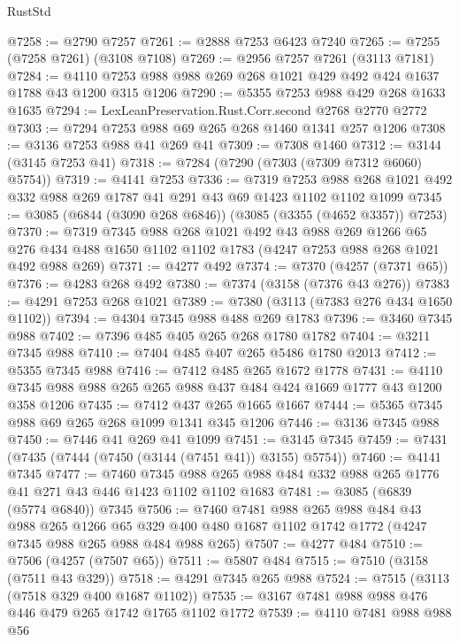 \begin{lexlean}{RustStd}
\begin{coremodule}
{\begin{coremodule}
{{{{{{{{{{{{{{{{{{{{{{{{{{@7258 := @2790 @7257
@7261 := @2888 @7253 @6423 @7240
@7265 := @7255 (@7258 @7261) (@3108 @7108)
@7269 := @2956 @7257 @7261 (@3113 @7181)
@7284 := @4110 @7253 @988 @988 @269 @268 @1021 @429 @492 @424 @1637 @1788 @43 @1200 @315 @1206
@7290 := @5355 @7253 @988 @429 @268 @1633 @1635
@7294 := LexLeanPreservation.Rust.Corr.second @2768 @2770 @2772
@7303 := @7294 @7253 @988 @69 @265 @268 @1460 @1341 @257 @1206
@7308 := @3136 @7253 @988 @41 @269 @41
@7309 := @7308 @1460
@7312 := @3144 (@3145 @7253 @41)
@7318 := @7284 (@7290 (@7303 (@7309 @7312 @6060) @5754))
@7319 := @4141 @7253
@7336 := @7319
    @7253
    @988
    @268
    @1021
    @492
    @332
    @988
    @269
    @1787
    @41
    @291
    @43
    @69
    @1423
    @1102
    @1102
    @1099
@7345 := @3085 (@6844 (@3090 @268 @6846)) (@3085 (@3355 (@4652 @3357)) @7253)
@7370 := @7319
    @7345
    @988
    @268
    @1021
    @492
    @43
    @988
    @269
    @1266
    @65
    @276
    @434
    @488
    @1650
    @1102
    @1102
    @1783
    (@4247 @7253 @988 @268 @1021 @492 @988 @269)
@7371 := @4277 @492
@7374 := @7370 (@4257 (@7371 @65))
@7376 := @4283 @268 @492
@7380 := @7374 (@3158 (@7376 @43 @276))
@7383 := @4291 @7253 @268 @1021
@7389 := @7380 (@3113 (@7383 @276 @434 @1650 @1102))
@7394 := @4304 @7345 @988 @488 @269 @1783
@7396 := @3460 @7345 @988
@7402 := @7396 @485 @405 @265 @268 @1780 @1782
@7404 := @3211 @7345 @988
@7410 := @7404 @485 @407 @265 @5486 @1780 @2013
@7412 := @5355 @7345 @988
@7416 := @7412 @485 @265 @1672 @1778
@7431 := @4110 @7345 @988 @988 @265 @265 @988 @437 @484 @424 @1669 @1777 @43 @1200 @358 @1206
@7435 := @7412 @437 @265 @1665 @1667
@7444 := @5365 @7345 @988 @69 @265 @268 @1099 @1341 @345 @1206
@7446 := @3136 @7345 @988
@7450 := @7446 @41 @269 @41 @1099
@7451 := @3145 @7345
@7459 := @7431 (@7435 (@7444 (@7450 (@3144 (@7451 @41)) @3155) @5754))
@7460 := @4141 @7345
@7477 := @7460
    @7345
    @988
    @265
    @988
    @484
    @332
    @988
    @265
    @1776
    @41
    @271
    @43
    @446
    @1423
    @1102
    @1102
    @1683
@7481 := @3085 (@6839 (@5774 @6840)) @7345
@7506 := @7460
    @7481
    @988
    @265
    @988
    @484
    @43
    @988
    @265
    @1266
    @65
    @329
    @400
    @480
    @1687
    @1102
    @1742
    @1772
    (@4247 @7345 @988 @265 @988 @484 @988 @265)
@7507 := @4277 @484
@7510 := @7506 (@4257 (@7507 @65))
@7511 := @5807 @484
@7515 := @7510 (@3158 (@7511 @43 @329))
@7518 := @4291 @7345 @265 @988
@7524 := @7515 (@3113 (@7518 @329 @400 @1687 @1102))
@7535 := @3167 @7481 @988 @988 @476 @446 @479 @265 @1742 @1765 @1102 @1772
@7539 := @4110 @7481 @988 @988 @56
}}}}}}}}}}}}}}}}}}}}}}}}}}
\end{coremodule}}
\end{coremodule}
\end{lexlean}
